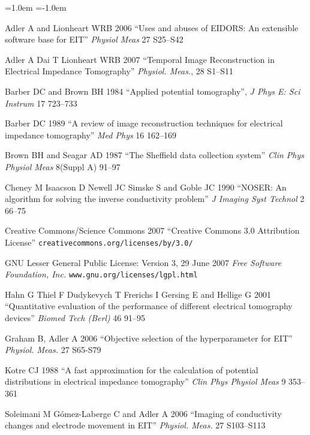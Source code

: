 \documentclass[letterpaper,twocolumn,11pt]{article}
\begin{document}
\begin{list}{}
  {\leftmargin=1.0em \itemindent=-1.0em
    \baselineskip
    \baselineskip}
\item[]
Adler A and Lionheart WRB 2006
``Uses and abuses of EIDORS: An extensible software base for EIT''
{\em Physiol Meas}
27 S25--S42

\item[]
Adler A Dai T Lionheart WRB 2007
``Temporal Image Reconstruction in Electrical Impedance Tomography''
{\em Physiol. Meas.}, 28 S1--S11


\item[]
Barber DC and Brown BH 1984
``Applied potential tomography'', 
{\em J Phys E: Sci Instrum}
 17 723--733

\item[]
Barber DC 1989
``A review of image reconstruction techniques for electrical
 impedance tomography''
{\em Med Phys}
16 162--169

\item[]
Brown BH and Seagar AD 1987 
``The Sheffield data collection system''
{\em Clin Phys Physiol Meas}
 8(Suppl A) 91--97

\item[]
Cheney M Isaacson D Newell JC Simske S and Goble JC 1990
``NOSER: An algorithm for solving the inverse conductivity problem''
{\em J Imaging Syst Technol} 2 66--75

\item[]
Creative Commons/Science Commons 2007
``Creative Commons 3.0 Attribution License''
\verb+creativecommons.org/licenses/by/3.0/+

\item[]
GNU Lesser General Public License: Version 3, 29 June 2007
{\em Free Software Foundation, Inc.}
\verb+www.gnu.org/licenses/lgpl.html+

\item[]
Hahn G Thiel F Dudykevych T Frerichs I Gersing E
and Hellige G 2001
``Quantitative evaluation of the performance of
different electrical tomography devices''
{\em  Biomed Tech (Berl)}
46 91--95

\item[]
Graham B, Adler A 2006
``Objective selection of the hyperparameter for EIT''
{\em Physiol. Meas.}
27 S65-S79

\item[]
Kotre CJ 1988
``A fast approximation for the calculation of potential distributions in electrical impedance tomography''
{\em Clin Phys Physiol Meas}
9 353--361

\item[]
Soleimani M G\'omez-Laberge C and Adler A 2006
``Imaging of conductivity changes and electrode movement in EIT''
{\em Physiol. Meas.} 27 S103--S113

\end{list}
\end{document}
